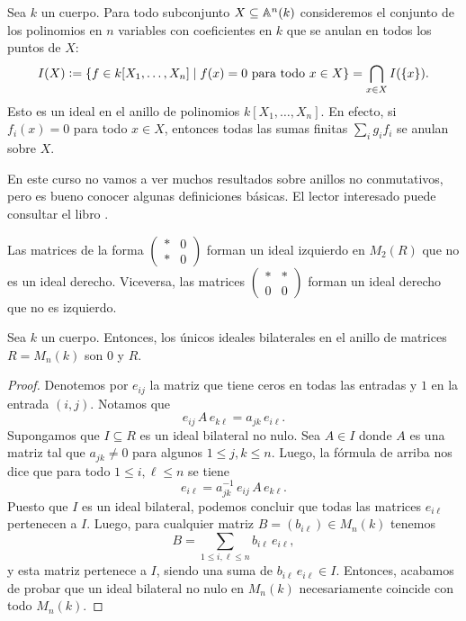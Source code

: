 \begin{ejemplo}
  \label{ejemplo:operacion-I}
  Sea $k$ un cuerpo. Para todo subconjunto $X \subseteq \AA^n (k)$ consideremos
  el conjunto de los polinomios en $n$ variables con coeficientes en $k$ que
  se anulan en todos los puntos de $X$:
  \[ I (X) \dfn
     \{ f \in k [X_1,\ldots,X_n] \mid f (x) = 0\text{ para todo }x\in X \} =
     \bigcap_{x\in X} I (\{ x \}). \]
  Esto es un ideal en el anillo de polinomios $k [X_1,\ldots,X_n]$. En efecto,
  si $f_i (x) = 0$ para todo $x\in X$, entonces todas las sumas finitas
  $\sum_i g_i f_i$ se anulan sobre $X$.
\end{ejemplo}

En este curso no vamos a ver muchos resultados sobre anillos no conmutativos,
pero es bueno conocer algunas definiciones básicas. El lector interesado puede
consultar el libro \cite{Lam-2001}.

\begin{ejemplo}
  Las matrices de la forma $\begin{pmatrix}
    \ast & 0 \\
    \ast & 0
  \end{pmatrix}$ forman un ideal izquierdo en $M_2 (R)$ que no es un ideal
  derecho. Viceversa, las matrices $\begin{pmatrix}
    \ast & \ast \\
    0 & 0
  \end{pmatrix}$ forman un ideal derecho que no es izquierdo.
\end{ejemplo}

\begin{observacion}
  \label{obs:ideales-en-Mnk}
  Sea $k$ un cuerpo. Entonces, los únicos ideales bilaterales en el anillo
  de matrices $R = M_n (k)$ son $0$ y $R$.

  \begin{proof}
    Denotemos por $e_{ij}$ la matriz que tiene ceros en todas las entradas y $1$
    en la entrada $(i,j)$. Notamos que
    $$e_{ij}\,A\,e_{k\ell} = a_{jk}\,e_{i\ell}.$$
    Supongamos que $I \subseteq R$ es un ideal bilateral no nulo. Sea $A \in I$
    donde $A$ es una matriz tal que $a_{jk} \ne 0$ para algunos
    $1 \le j,k \le n$. Luego, la fórmula de arriba nos dice que para todo
    $1 \le i,\ell \le n$ se tiene
    $$e_{i\ell} = a_{jk}^{-1}\,e_{ij}\,A\,e_{k\ell}.$$
    Puesto que $I$ es un ideal bilateral, podemos concluir que todas
    las matrices $e_{i\ell}$ pertenecen a $I$. Luego, para cualquier matriz
    $B = (b_{i\ell}) \in M_n (k)$ tenemos
    $$B = \sum_{1 \le i,\ell \le n} b_{i\ell}\,e_{i\ell},$$
    y esta matriz pertenece a $I$, siendo una suma
    de $b_{i\ell}\,e_{i\ell} \in I$. Entonces, acabamos de probar que un ideal
    bilateral no nulo en $M_n (k)$ necesariamente coincide con todo $M_n (k)$.
  \end{proof}
\end{observacion}

